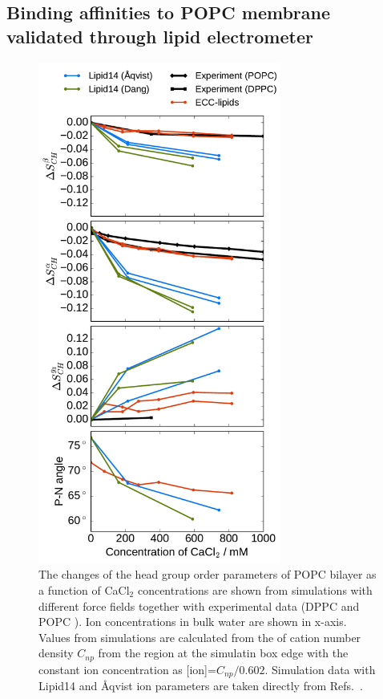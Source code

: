 \documentclass[aip,jcp,twocolumn]{revtex4}
\begin{document}
\subsection{Binding affinities to POPC membrane validated through lipid electrometer}

\begin{figure}[htb!]
  \centering
  \includegraphics[width=8.0cm]{../Fig/ipython_nb/PN_angle_OrdPars-A-B-g3_L14-ECCL17_q80_sig89_CaCl.pdf}
  \caption{\label{fig:delta_ordPar_CaCl}
    The changes of the head group order parameters of POPC bilayer as a function of CaCl$_2$ concentrations
    are shown from simulations with different force fields together with experimental data 
    (DPPC \cite{akutsu81} and POPC \cite{altenbach84}). 
    Ion concentrations in bulk water are shown in x-axis. 
    Values from simulations are calculated from the of cation number density $C_{np}$
    from the region at the simulatin box edge with the constant ion concentration as [ion]=$C_{np}/0.602$.
    Simulation data with Lipid14 and \AA{}qvist ion parameters are taken directly from
    Refs.~\cite{lipid14POPC0mMNaClfiles,lipid14POPC350mMCaClfiles,lipid14POPC350mMCaClfilesNC}.
  }
\end{figure}
\end{document}
